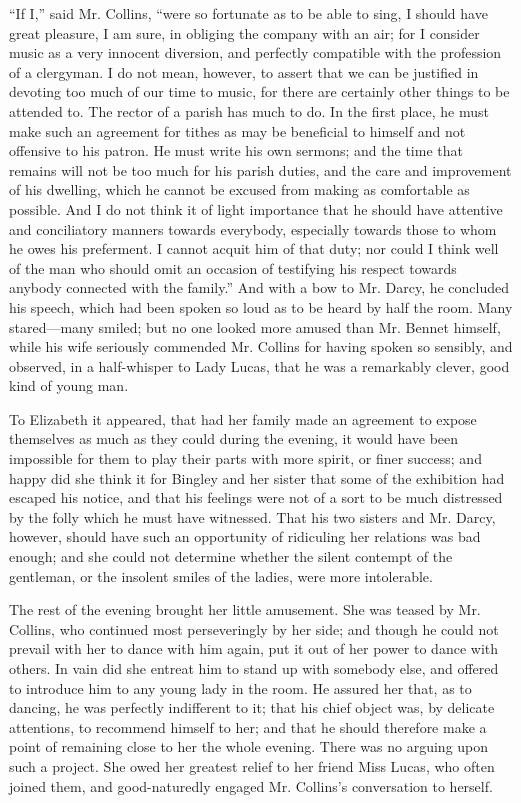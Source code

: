 \documentclass[12pt]{book}
\begin{document}
``If I,'' said Mr. Collins, ``were so fortunate as to be able to sing, I should have great pleasure, I am sure, in obliging the company with an air; for I consider music as a very innocent diversion, and perfectly compatible with the profession of a clergyman. I do not mean, however, to assert that we can be justified in devoting too much of our time to music, for there are certainly other things to be attended to. The rector of a parish has much to do. In the first place, he must make such an agreement for tithes as may be beneficial to himself and not offensive to his patron. He must write his own sermons; and the time that remains will not be too much for his parish duties, and the care and improvement of his dwelling, which he cannot be excused from making as comfortable as possible. And I do not think it of light importance that he should have attentive and conciliatory manners towards everybody, especially towards those to whom he owes his preferment. I cannot acquit him of that duty; nor could I think well of the man who should omit an occasion of testifying his respect towards anybody connected with the family.'' And with a bow to Mr. Darcy, he concluded his speech, which had been spoken so loud as to be heard by half the room. Many stared---many smiled; but no one looked more amused than Mr. Bennet himself, while his wife seriously commended Mr. Collins for having spoken so sensibly, and observed, in a half-whisper to Lady Lucas, that he was a remarkably clever, good kind of young man.

To Elizabeth it appeared, that had her family made an agreement to expose themselves as much as they could during the evening, it would have been impossible for them to play their parts with more spirit, or finer success; and happy did she think it for Bingley and her sister that some of the exhibition had escaped his notice, and that his feelings were not of a sort to be much distressed by the folly which he must have witnessed. That his two sisters and Mr. Darcy, however, should have such an opportunity of ridiculing her relations was bad enough; and she could not determine whether the silent contempt of the gentleman, or the insolent smiles of the ladies, were more intolerable.

The rest of the evening brought her little amusement. She was teased by Mr. Collins, who continued most perseveringly by her side; and though he could not prevail with her to dance with him again, put it out of her power to dance with others. In vain did she entreat him to stand up with somebody else, and offered to introduce him to any young lady in the room. He assured her that, as to dancing, he was perfectly indifferent to it; that his chief object was, by delicate attentions, to recommend himself to her; and that he should therefore make a point of remaining close to her the whole evening. There was no arguing upon such a project. She owed her greatest relief to her friend Miss Lucas, who often joined them, and good-naturedly engaged Mr. Collins's conversation to herself.
\end{document}
